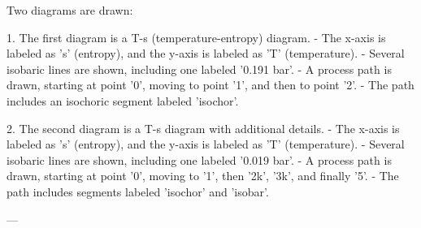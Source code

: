 Two diagrams are drawn:  

1. The first diagram is a T-s (temperature-entropy) diagram.  
   - The x-axis is labeled as 's' (entropy), and the y-axis is labeled as 'T' (temperature).  
   - Several isobaric lines are shown, including one labeled '0.191 bar'.  
   - A process path is drawn, starting at point '0', moving to point '1', and then to point '2'.  
   - The path includes an isochoric segment labeled 'isochor'.  

2. The second diagram is a T-s diagram with additional details.  
   - The x-axis is labeled as 's' (entropy), and the y-axis is labeled as 'T' (temperature).  
   - Several isobaric lines are shown, including one labeled '0.019 bar'.  
   - A process path is drawn, starting at point '0', moving to '1', then '2k', '3k', and finally '5'.  
   - The path includes segments labeled 'isochor' and 'isobar'.  

---